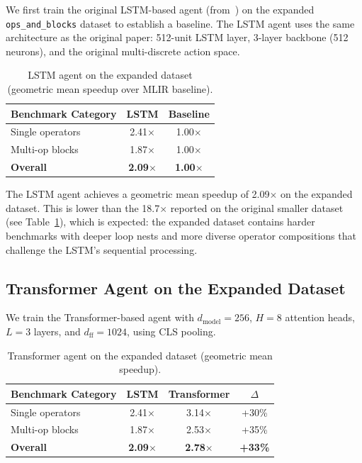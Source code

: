 \documentclass[10pt,twocolumn]{article}
\begin{document}
We first train the original LSTM-based agent (from~\cite{ref41}) on the expanded \texttt{ops\_and\_blocks} dataset to establish a baseline. The LSTM agent uses the same architecture as the original paper: 512-unit LSTM layer, 3-layer backbone (512 neurons), and the original multi-discrete action space.

\begin{table}[t]
\centering
\caption{LSTM agent on the expanded dataset (geometric mean speedup over MLIR baseline).}
\label{tab:lstm_expanded}
\begin{tabular}{lcc}
\toprule
Benchmark Category & LSTM & Baseline \\
\midrule
Single operators & 2.41$\times$ & 1.00$\times$ \\
Multi-op blocks & 1.87$\times$ & 1.00$\times$ \\
\midrule
\textbf{Overall} & \textbf{2.09$\times$} & \textbf{1.00$\times$} \\
\bottomrule
\end{tabular}
\end{table}

The LSTM agent achieves a geometric mean speedup of 2.09$\times$ on the expanded dataset. This is lower than the 18.7$\times$ reported on the original smaller dataset (see Table~\ref{tab:lstm_expanded}), which is expected: the expanded dataset contains harder benchmarks with deeper loop nests and more diverse operator compositions that challenge the LSTM's sequential processing.

\subsection{Transformer Agent on the Expanded Dataset}

We train the Transformer-based agent with $d_{\text{model}}=256$, $H=8$ attention heads, $L=3$ layers, and $d_{\text{ff}}=1024$, using CLS pooling.

\begin{table}[t]
\centering
\caption{Transformer agent on the expanded dataset (geometric mean speedup).}
\label{tab:transformer_expanded}
\begin{tabular}{lccc}
\toprule
Benchmark Category & LSTM & Transformer & $\Delta$ \\
\midrule
Single operators & 2.41$\times$ & 3.14$\times$ & +30\% \\
Multi-op blocks & 1.87$\times$ & 2.53$\times$ & +35\% \\
\midrule
\textbf{Overall} & \textbf{2.09$\times$} & \textbf{2.78$\times$} & \textbf{+33\%} \\
\bottomrule
\end{tabular}
\end{table}
\end{document}
